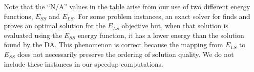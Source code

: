 \documentclass[preprint,12pt]{elsarticle}
\newcommand{\qcls}{{\sf {\small QC-LS\xspace}}}
\begin{document}
Note that the ``N/A'' values in the table arise from our use of two different energy functions, $E_{SS}$ and $E_{LS}$. For some problem instances, an exact solver for \qcls{} finds and proves an optimal solution for the $E_{LS}$ objective but, when that solution is evaluated using the $E_{SS}$ energy function, it has a lower energy than the solution found by the DA. This phenomenon is correct because the mapping from $E_{LS}$ to $E_{SS}$ does not necessarily preserve the ordering of solution quality. We do not include these instances in our speedup computations.  




%

\end{document}
